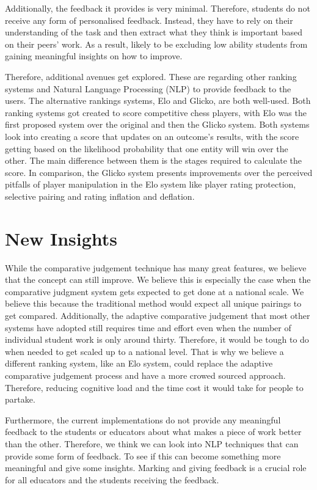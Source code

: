 	Additionally, the feedback it provides is very minimal. Therefore, students do not receive any form of personalised feedback. Instead, they have to rely on their understanding of the task and then extract what they think is important based on their peers' work. As a result, likely to be excluding low ability students from gaining meaningful insights on how to improve.
	
	Therefore, additional avenues get explored. These are regarding other ranking systems and Natural Language Processing (NLP) to provide feedback to the users. The alternative rankings systems, Elo and Glicko, are both well-used. Both ranking systems got created to score competitive chess players, with Elo was the first proposed system over the original and then the Glicko system. Both systems look into creating a score that updates on an outcome's results, with the score getting based on the likelihood probability that one entity will win over the other. The main difference between them is the stages required to calculate the score. In comparison, the Glicko system presents improvements over the perceived pitfalls of player manipulation in the Elo system like player rating protection, selective pairing and rating inflation and deflation.
	
	\section{New Insights}
	While the comparative judgement technique has many great features, we believe that the concept can still improve. We believe this is especially the case when the comparative judgment system gets expected to get done at a national scale. We believe this because the traditional method would expect all unique pairings to get compared. Additionally, the adaptive comparative judgement that most other systems have adopted still requires time and effort even when the number of individual student work is only around thirty. Therefore, it would be tough to do when needed to get scaled up to a national level. That is why we believe a different ranking system, like an Elo system, could replace the adaptive comparative judgement process and have a more crowed sourced approach. Therefore, reducing cognitive load and the time cost it would take for people to partake. 
	
	Furthermore, the current implementations do not provide any meaningful feedback to the students or educators about what makes a piece of work better than the other. Therefore, we think we can look into NLP techniques that can provide some form of feedback. To see if this can become something more meaningful and give some insights. Marking and giving feedback is a crucial role for all educators and the students receiving the feedback.


